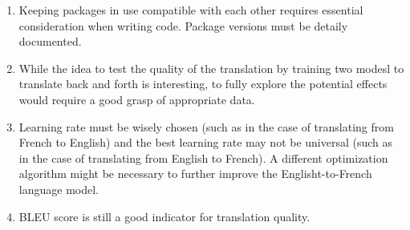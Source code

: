 \documentclass[11pt]{article}
\providecommand{\tightlist}{%
      \setlength{\itemsep}{0pt}\setlength{\parskip}{0pt}}
\begin{document}
\begin{enumerate}
\def\labelenumi{\arabic{enumi}.}
\tightlist
\item
  Keeping packages in use compatible with each other requires essential
  consideration when writing code. Package versions must be detaily
  documented.
\item
  While the idea to test the quality of the translation by training two
  modesl to translate back and forth is interesting, to fully explore
  the potential effects would require a good grasp of appropriate data.
\item
  Learning rate must be wisely chosen (such as in the case of
  translating from French to English) and the best learning rate may not
  be universal (such as in the case of translating from English to
  French). A different optimization algorithm might be necessary to
  further improve the Englisht-to-French language model.
\item
  BLEU score is still a good indicator for translation quality.
\end{enumerate}


    
    
    
    
\end{document}
